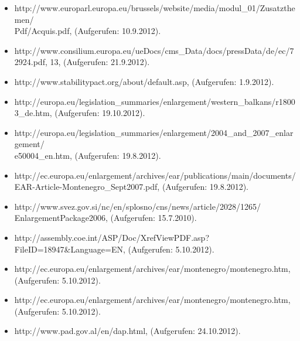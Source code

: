 \begin{itemize}[label={},leftmargin=*,itemsep=0pt,parsep=10pt]
\item http://www.europarl.europa.eu/brussels/website/media/modul\_01/Zusatzthemen/\\Pdf/Acquis.pdf, (Aufgerufen: 10.9.2012).
\item http://www.consilium.europa.eu/ueDocs/cms\_Data/docs/pressData/de/ec/72924.pdf, 13, (Aufgerufen: 21.9.2012).
\item http://www.stabilitypact.org/about/default.asp, (Aufgerufen: 1.9.2012).
\item http://europa.eu/legislation\_summaries/enlargement/western\_balkans/r18003\_de.htm, (Aufgerufen: 19.10.2012).
\item http://europa.eu/legislation\_summaries/enlargement/2004\_and\_2007\_enlargement/\\e50004\_en.htm, (Aufgerufen: 19.8.2012).
\item http://ec.europa.eu/enlargement/archives/ear/publications/main/documents/
EAR-Article-Montenegro\_Sept2007.pdf, (Aufgerufen: 19.8.2012).
\item http://www.svez.gov.si/nc/en/splosno/cns/news/article/2028/1265/\\EnlargementPackage2006, (Aufgerufen: 15.7.2010).
\item http://assembly.coe.int/ASP/Doc/XrefViewPDF.asp?FileID=18947\&Language=EN, (Aufgerufen: 5.10.2012).
\item http://ec.europa.eu/enlargement/archives/ear/montenegro/montenegro.htm, (Aufgerufen: 5.10.2012).
\item http://ec.europa.eu/enlargement/archives/ear/montenegro/montenegro.htm, (Aufgerufen: 5.10.2012).
\item http://www.pad.gov.al/en/dap.html, (Aufgerufen: 24.10.2012).
\end{itemize}
\providecommand*{\appendixmore}{}%
\newcommand*{\SavedOriginalchaptertocentry}{}
\appto\appendixmore{%
  \let\SavedOriginaladdchaptertocentry\addchaptertocentry
  \renewcommand*{\addchaptertocentry}[2]{%
    \ifstr{#1}{}{%
      \SavedOriginalchaptertocentry{#1}{#2}%
    }{%
      \SavedOriginaladdchaptertocentry{}{%
        \string\expandafter\string\MakeUppercase\string\appendixname
        ~#1:\string\enskip{}#2}%
    }%
  }%
}
\clearpage

\appendix
\pagestyle{empty}
%
%
%
%
%
%



